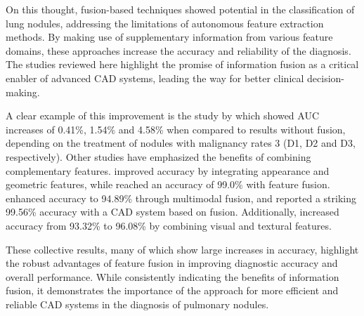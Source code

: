 On this thought, fusion-based techniques showed potential in the classification of lung nodules, addressing the limitations of autonomous feature extraction methods. By making use of supplementary information from various feature domains, these approaches increase the accuracy and reliability of the diagnosis. The studies reviewed here highlight the promise of information fusion as a critical enabler of advanced CAD systems, leading the way for better clinical decision-making.

A clear example of this improvement is the study by \citet{xie_fusing_2018} which showed AUC increases of 0.41\%, 1.54\% and 4.58\% when compared to results without fusion, depending on the treatment of nodules with malignancy rates 3 (D1, D2 and D3, respectively).
Other studies have emphasized the benefits of combining complementary features. \citet{shaffie_computer-assisted_2022} improved accuracy by integrating appearance and geometric features, while \citet{saba_lung_2019} reached an accuracy of 99.0\% with feature fusion. \citet{yuan_multi-modal_2023} enhanced accuracy to 94.89\% through multimodal fusion, and \citet{liu_artificial_2022} reported a striking 99.56\% accuracy with a CAD system based on fusion. Additionally, \citet{iqbal_fusion_2023} increased accuracy from 93.32\% to 96.08\% by combining visual and textural features.

These collective results, many of which show large increases in accuracy, highlight the robust advantages of feature fusion in improving diagnostic accuracy and overall performance. While consistently indicating the benefits of information fusion, it demonstrates the importance of the approach for more efficient and reliable CAD systems in the diagnosis of pulmonary nodules.